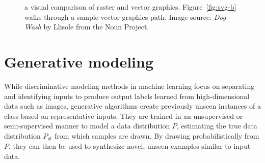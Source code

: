 \begin{figure}[t]
     \quad
    \caption[An overview of the specification for scalable vector graphics (SVG)]{a visual comparison of raster and vector graphics. Figure~\ref{fig:svg-b} walks through a sample vector graphics path. Image source: \textit{Dog Wash} by Llisole from the Noun Project.\label{fig:svg}}
\end{figure}


\section{Generative modeling}
While discriminative modeling methods in machine learning focus on separating and identifying inputs to produce output labels learned from high-dimensional data such as images, generative algorithms create previously unseen instances of a class based on representative inputs.
They are trained in an unsupervised or semi-supervised manner to model a data distribution $P$, estimating the true data distribution $P_{gt}$ from which samples are drawn.
By drawing probabilistically from $P$, they can then be used to synthesize novel, unseen examples similar to input data.

